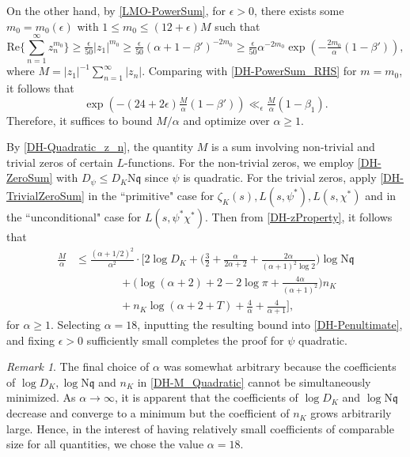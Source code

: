 \documentclass[12pt,psamsfonts]{amsart}
\theoremstyle{definition}
\theoremstyle{remark}
\numberwithin{equation}{section}
\theoremstyle{plain}
\theoremstyle{remark}
\newtheorem*{rem*}{Remark}
\renewcommand{\1}{ {\bf 1}}
\newcommand{\N}{\mathrm{N}}
\newcommand{\kq}{\mathfrak{q}}
\renewcommand{\Re}{\mathrm{Re}}
\begin{document}
On the other hand, by \cref{LMO-PowerSum}, for $\epsilon > 0$, there exists some $m_0 = m_0(\epsilon)$ with $1 \leq m_0 \leq (12+\epsilon)M$ such that
\[
\Re\Big\{ \sum_{n=1}^{\infty} z_n^{m_0} \Big\} \geq \tfrac{\epsilon}{50}  |z_1|^{m_0} \geq \tfrac{\epsilon}{50} (\alpha+1-\beta')^{-2m_0} \geq \tfrac{\epsilon}{50} \alpha^{-2m_0} \exp(-\tfrac{2m_0}{\alpha}(1-\beta') ), 
\]
where $M= |z_1|^{-1} \sum_{n=1}^{\infty} |z_n|$. Comparing with \eqref{DH-PowerSum_RHS} for $m = m_0$, it follows that
\begin{equation}
\exp(-(24+2\epsilon)\tfrac{M}{\alpha} (1-\beta') ) \ll_{\epsilon} \tfrac{M}{\alpha} (1-\beta_1). 
\label{DH-Penultimate}
\end{equation}
Therefore, it  suffices to bound $M/\alpha$ and optimize over $\alpha \geq 1$. 


By \eqref{DH-Quadratic_z_n}, the quantity $M$ is a sum involving non-trivial and trivial zeros of certain $L$-functions. For the non-trivial zeros, we employ \cref{DH-ZeroSum} with $D_{\psi} \leq D_K \N\kq$ since $\psi$ is quadratic. For the trivial zeros, apply \cref{DH-TrivialZeroSum}   in the ``primitive" case for $\zeta_K(s), L(s,\psi^*), L(s,\chi^*)$ and  in the ``unconditional" case for $L(s,\psi^*\chi^*)$. Then from \eqref{DH-zProperty}, it follows that
\begin{equation}
\label{DH-M_Quadratic}
\begin{aligned}
\frac{M}{\alpha}  & \leq \frac{(\alpha+1/2)^{2}}{\alpha^2}   \cdot \Big[ 2 \log D_K + \Big( \frac{3}{2} + \frac{\alpha}{2\alpha+2} + \frac{2 \alpha}{(\alpha+1)^2 \log 2} \Big) \log \N\kq \\
& \qquad\qquad +\Big( \log(\alpha+2)  + 2 - 2\log \pi + \frac{4\alpha}{(\alpha+1)^2} \Big) n_K \\
& \qquad\qquad+  n_K \log(\alpha+2+ T)+ \frac{4}{\alpha} + \frac{4}{\alpha+1} \Big],  
\end{aligned}
\end{equation}
for $\alpha \geq 1$. Selecting $\alpha = 18$, inputting the resulting bound into \eqref{DH-Penultimate}, and fixing $\epsilon > 0$ sufficiently small completes the proof for $\psi$ quadratic.  

\begin{rem*}
	The final choice of $\alpha$ was somewhat arbitrary because the coefficients of $\log D_K, \log \N\kq$ and $n_K$ in \eqref{DH-M_Quadratic} cannot be simultaneously minimized. As $\alpha \rightarrow \infty$, it is apparent that the coefficients of $\log D_K$ and $\log \N\kq$ decrease and converge to a minimum  but the coefficient of $n_K$ grows arbitrarily large. Hence, in the interest of having relatively small coefficients of comparable size for all quantities, we chose the value $\alpha = 18$. 
\end{rem*}
\end{document}
